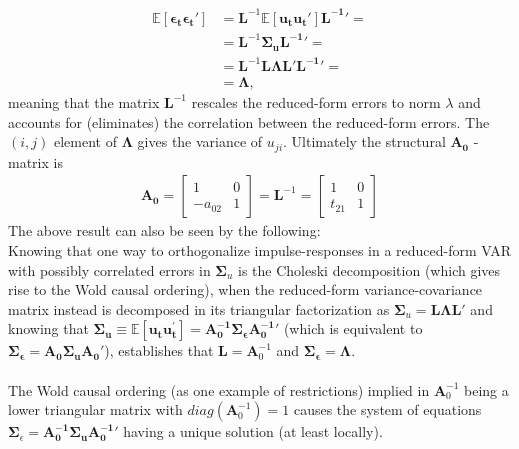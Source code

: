 \documentclass[a4paper,11pt,listof=nochaptergap,oneside,pointednumbers,bibtotoc,bigheadings,liststotoc]{scrbook}
\theoremstyle{mysatz}
\theoremstyle{mydefinition}
\theoremstyle{mybemerkung}
\newcommand{\vect}[1]{\boldsymbol{\mathbf{#1}}}
\begin{document}
\begin{equation} \label{eq:svar22}
\begin{split}
	\mathbb{E}[\vect{\epsilon_t}\vect{\epsilon_t}'] & = \vect{L}^{-1} \mathbb{E}[\vect{u_t}\vect{u_t}']\vect{L^{-1}}' = \\
										& = \vect{L}^{-1} \vect{\Sigma_u} \vect{L^{-1}}' = \\
										& = \vect{L}^{-1} \vect{L \Lambda L}' \vect{L^{-1}}' = \\
										& = \vect{\Lambda},
\end{split}								
\end{equation}
meaning that the matrix $\vect{L}^{-1}$ rescales the reduced-form errors to norm $\lambda$ and accounts for (eliminates) the correlation between the reduced-form errors. The $(i, j)$ element of $\vect{\Lambda}$ gives the variance of $u_{ji}$. Ultimately the structural $\vect{A_0}$ - matrix is
\begin{equation} \label{eq:svar23}
\begin{split}
	\vect{A_0} = \begin{bmatrix}
    					1 & 0 \\
					-a_{02} & 1
 					\end{bmatrix} = 
					\vect{L}^{-1} = 
						\begin{bmatrix}
    						1 & 0 \\
						t_{21} & 1
 						\end{bmatrix}
\end{split}								
\end{equation}
The above result can also be seen by the following:\\
Knowing that one way to orthogonalize impulse-responses in a reduced-form VAR with possibly correlated errors in $\vect{\Sigma}_u$ is the Choleski decomposition (which gives rise to the Wold causal ordering), when the reduced-form variance-covariance matrix instead is decomposed in its triangular factorization as $\vect{\Sigma}_u = \vect{L}\vect{\Lambda}\vect{L}'$ and knowing that $\vect{\Sigma_u}  \equiv \mathbb{E}[\vect{u_t}\vect{u_t^'}]= \vect{A_0^{-1}}\vect{\Sigma_\epsilon}\vect{A_0^{-1}}'$ (which is equivalent to $\vect{\Sigma_\epsilon} = \vect{A_0}\vect{\Sigma_u}\vect{A_0}'$), establishes that $\vect{L} = \vect{A}_0^{-1}$ and $\vect{\Sigma_\epsilon} = \vect{\Lambda}$. 
\\
\\
The Wold causal ordering (as one example of restrictions) implied in $\vect{A}_0^{-1}$ being a lower triangular matrix with $diag(\vect{A}_0^{-1}) = 1$ causes the system of equations $\vect{\Sigma}_\epsilon  = \vect{A_0^{-1}}\vect{\Sigma_u}\vect{A_0^{-1}}'$ having a unique solution (at least locally).
\end{document}

